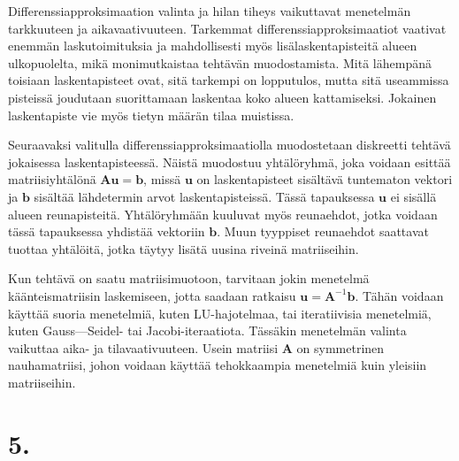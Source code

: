 \documentclass{article}
\begin{document}
Differenssiapproksimaation valinta ja hilan tiheys vaikuttavat
menetelmän tarkkuuteen ja aikavaativuuteen. Tarkemmat
differenssiapproksimaatiot vaativat enemmän laskutoimituksia ja mahdolli\-sesti
myös lisälaskentapisteitä alueen ulkopuolelta, mikä monimutkaistaa tehtävän
muodostamista. Mitä lähempänä toisiaan laskentapisteet ovat, sitä tarkempi on
lopputulos, mutta sitä useammissa pisteissä joudutaan suorittamaan laskentaa
koko alueen kattamiseksi.  Jokainen laskentapiste vie myös tietyn määrän tilaa
muistissa.

Seuraavaksi valitulla differenssiapproksimaatiolla muodostetaan diskreetti
tehtävä jokaisessa las\-kentapisteessä. Näistä muodostuu yhtälöryhmä, joka
voidaan esittää matriisiyhtälönä $\mathbf{A}\mathbf{u} = \mathbf{b}$, missä
$\mathbf{u}$ on laskentapisteet sisältävä tuntematon vektori ja $\mathbf{b}$
sisältää lähdetermin arvot laskentapisteissä. Tässä tapauksessa $\mathbf{u}$ ei
sisällä alueen reunapisteitä. Yhtälöryhmään kuuluvat myös reuna\-ehdot, jotka
voidaan tässä tapauksessa yhdistää vektoriin $\mathbf{b}$. Muun tyyppiset
reunaehdot saattavat tuottaa yhtälöitä, jotka täytyy lisätä uusina riveinä
matriiseihin.

Kun tehtävä on saatu matriisimuotoon, tarvitaan jokin menetelmä käänteismatriisin
laskemiseen, jotta saadaan ratkaisu $\mathbf{u} = \mathbf{A}^{-1}\mathbf{b}$.
Tähän voidaan käyttää suoria menetelmiä, kuten LU-hajotelmaa, tai iteratiivisia
menetelmiä, kuten Gauss—Seidel- tai Jacobi-iteraatiota. Tässäkin menetelmän
va\-linta vaikuttaa aika- ja tilavaativuuteen. Usein matriisi $\mathbf{A}$ on
symmetrinen nauhamatriisi, johon voidaan käyttää tehokkaampia menetelmiä
kuin yleisiin matriiseihin.

\newpage
\section*{5.}
\end{document}

